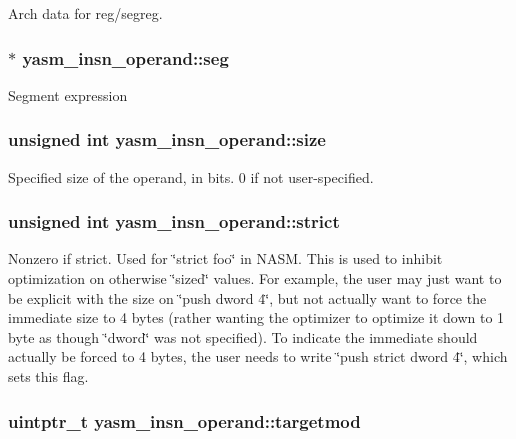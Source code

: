 Arch data for reg/segreg. \hypertarget{structyasm__insn__operand_ab099b11f4b22240a783e1e4eec1f186f}{
\subsubsection[{seg}]{$\ast$ yasm\-\_\-insn\-\_\-operand\-::seg}}\label{structyasm__insn__operand_ab099b11f4b22240a783e1e4eec1f186f}
Segment expression \hypertarget{structyasm__insn__operand_ad6a8305ba606635ded3270169854963b}{
\subsubsection[{size}]{\setlength{\rightskip}{0pt plus 5cm}unsigned int yasm\-\_\-insn\-\_\-operand\-::size}}\label{structyasm__insn__operand_ad6a8305ba606635ded3270169854963b}
Specified size of the operand, in bits. 0 if not user-\/specified. \hypertarget{structyasm__insn__operand_a9115b46ccbd8239fd7c634d783e25a03}{
\subsubsection[{strict}]{\setlength{\rightskip}{0pt plus 5cm}unsigned int yasm\-\_\-insn\-\_\-operand\-::strict}}\label{structyasm__insn__operand_a9115b46ccbd8239fd7c634d783e25a03}
Nonzero if strict. Used for \char`\"{}strict foo\char`\"{} in N\-A\-S\-M. This is used to inhibit optimization on otherwise \char`\"{}sized\char`\"{} values. For example, the user may just want to be explicit with the size on \char`\"{}push dword 4\char`\"{}, but not actually want to force the immediate size to 4 bytes (rather wanting the optimizer to optimize it down to 1 byte as though \char`\"{}dword\char`\"{} was not specified). To indicate the immediate should actually be forced to 4 bytes, the user needs to write \char`\"{}push strict dword 4\char`\"{}, which sets this flag. \hypertarget{structyasm__insn__operand_a33caa5eb90eee1ef2fee73618796096a}{
\subsubsection[{targetmod}]{\setlength{\rightskip}{0pt plus 5cm}uintptr\-\_\-t yasm\-\_\-insn\-\_\-operand\-::targetmod}}\label{structyasm__insn__operand_a33caa5eb90eee1ef2fee73618796096a}
